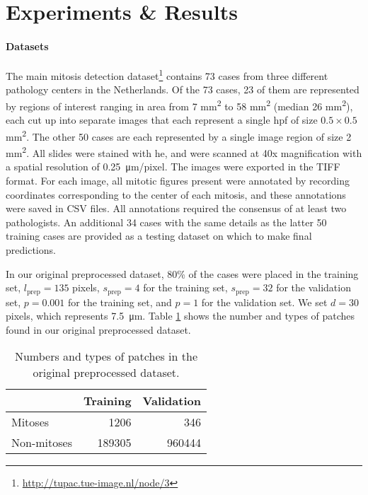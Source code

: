 \section{Experiments \& Results}


\paragraph{Datasets}
The main mitosis detection dataset\footnote{\url{http://tupac.tue-image.nl/node/3}} contains 73 cases from three different pathology centers in the Netherlands.  Of the 73 cases, 23 of them are represented by regions of interest ranging in area from 7 mm\textsuperscript{2} to 58 mm\textsuperscript{2} (median 26 mm\textsuperscript{2}), each cut up into separate images that each represent a single \gls{hpf} of size $0.5 \times 0.5$ mm\textsuperscript{2}.  The other 50 cases are each represented by a single image region of size 2 mm\textsuperscript{2}.  All slides were stained with \gls{he}, and were scanned at 40x magnification with a spatial resolution of \SI{0.25}{\micro\meter/pixel}.  The images were exported in the TIFF format.  For each image, all mitotic figures present were annotated by recording coordinates corresponding to the center of each mitosis, and these annotations were saved in CSV files.  All annotations required the consensus of at least two pathologists.  An additional 34 cases with the same details as the latter 50 training cases are provided as a testing dataset on which to make final predictions.

In our original preprocessed dataset, 80\% of the cases were placed in the training set, $l_\text{prep} = 135$ pixels, $s_\text{prep} = 4$ for the training set, $s_\text{prep} = 32$ for the validation set, $p = 0.001$ for the training set, and $p = 1$ for the validation set.  We set $d = 30$ pixels, which represents \SI{7.5}{\micro\meter}.  Table \ref{tab:data_orig} shows the number and types of patches found in our original preprocessed dataset.

\begin{table}%
  \centering
  \begin{tabular}{l | r | r}
    & Training  & Validation \\
    \hline
    Mitoses     & 1206   & 346 \\
    Non-mitoses & 189305 & 960444 \\
  \end{tabular}
  \caption{Numbers and types of patches in the original preprocessed dataset.}
  \label{tab:data_orig}
\end{table}

